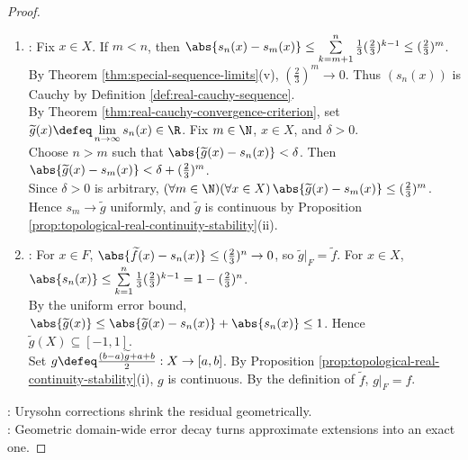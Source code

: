 \begin{theorem}
\begin{proof}
\begin{enumerate}[label=(\roman*)]
Then $h:F\to[-A_n,A_n]$ is continuous by the induction bound and Proposition \ref{prop:topological-real-continuity-stability}(i).\\
By the correction step with $A=A_n$, choose a continuous $u_n:X\to\R$.\\
The domain-wide bound $(\forall x\in X)\,\abs{u_n(x)}\leq\frac{1}{3}(\frac{2}{3})^{n-1}$ holds.\\
The residual bound $(\forall x\in F)\,\abs{\widetilde f(x)-s_{n-1}(x)-u_n(x)}\leq(\frac{2}{3})^n$ also holds.\\
Set $s_n\defeq s_{n-1}+u_n$. By Proposition \ref{prop:topological-real-continuity-stability}(i), $s_n$ is continuous. Sequence $(s_n)$ follows by induction.
\item {}: Fix $x\in X$. If $m<n$, then $\abs{s_n(x)-s_m(x)}\leq\sum\limits_{k=m+1}^n\frac{1}{3}(\frac{2}{3})^{k-1}\leq(\frac{2}{3})^m$.\\
By Theorem \ref{thm:special-sequence-limits}(v), $(\frac{2}{3})^m\to0$. Thus $(s_n(x))$ is Cauchy by Definition \ref{def:real-cauchy-sequence}.\\
By Theorem \ref{thm:real-cauchy-convergence-criterion}, set $\widetilde g(x)\defeq\lim\limits_{n\to\infty}s_n(x)\in\R$. Fix $m\in\N$, $x\in X$, and $\delta>0$.\\
Choose $n>m$ such that $\abs{\widetilde g(x)-s_n(x)}<\delta$. Then $\abs{\widetilde g(x)-s_m(x)}<\delta+(\frac{2}{3})^m$.\\
Since $\delta>0$ is arbitrary, $(\forall m\in\N)(\forall x\in X)\,\abs{\widetilde g(x)-s_m(x)}\leq(\frac{2}{3})^m$.\\
Hence $s_m\to\widetilde g$ uniformly, and $\widetilde g$ is continuous by Proposition \ref{prop:topological-real-continuity-stability}(ii).
\item {}: For $x\in F$, $\abs{\widetilde f(x)-s_n(x)}\leq(\frac{2}{3})^n\to0$, so $\widetilde g|_F=\widetilde f$. For $x\in X$, $\abs{s_n(x)}\leq\sum\limits_{k=1}^n\frac{1}{3}(\frac{2}{3})^{k-1}=1-(\frac{2}{3})^n$.\\
By the uniform error bound, $\abs{\widetilde g(x)}\leq\abs{\widetilde g(x)-s_n(x)}+\abs{s_n(x)}\leq1$. Hence $\widetilde g(X)\subseteq[-1,1]$.\\
Set $g\defeq\frac{(b-a)\widetilde g+a+b}{2}:X\to[a,b]$. By Proposition \ref{prop:topological-real-continuity-stability}(i), $g$ is continuous. By the definition of $\widetilde f$, $g|_F=f$.
\end{enumerate}
: Urysohn corrections shrink the residual geometrically.\\
: Geometric domain-wide error decay turns approximate extensions into an exact one.
\end{proof}
\end{theorem}
